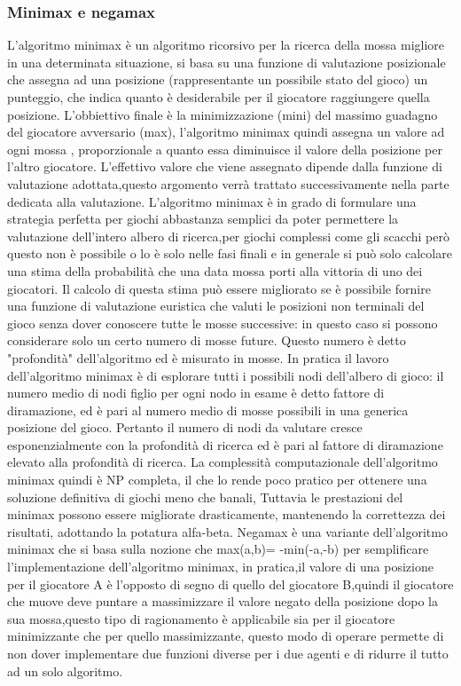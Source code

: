 \subsubsection{Minimax e negamax}
L'algoritmo minimax è un algoritmo ricorsivo per la ricerca della mossa migliore in una determinata situazione,
si basa su una funzione di valutazione posizionale che assegna ad una posizione (rappresentante un possibile stato del gioco)
un punteggio, che indica quanto è desiderabile per il giocatore raggiungere quella posizione.
L'obbiettivo finale è la minimizzazione (mini) del massimo guadagno del giocatore avversario (max),
l'algoritmo minimax quindi  assegna un valore ad ogni mossa , proporzionale a quanto essa diminuisce il
valore della posizione per l'altro giocatore.
L'effettivo valore che viene assegnato dipende dalla funzione di valutazione adottata,questo argomento verrà 
trattato successivamente nella parte dedicata alla valutazione.
L'algoritmo minimax è in grado di formulare una strategia perfetta per giochi abbastanza semplici da poter permettere 
la valutazione dell'intero albero di ricerca,per giochi complessi come gli scacchi però questo non è possibile o lo è 
solo nelle fasi finali e in generale si può solo calcolare una stima della probabilità che una data mossa porti alla vittoria di
uno dei giocatori.
Il calcolo di questa stima può essere migliorato se è possibile fornire una funzione di valutazione euristica che
valuti le posizioni non terminali del gioco senza dover conoscere tutte le mosse successive: in questo caso si possono
considerare solo un certo numero di mosse future. Questo numero è detto "profondità" dell'algoritmo ed è misurato
in mosse.
In pratica il lavoro dell'algoritmo minimax è di esplorare tutti i possibili nodi dell'albero di gioco: il
numero medio di nodi figlio per ogni nodo in esame è detto fattore di diramazione, ed è pari al numero medio
di mosse possibili in una generica posizione del gioco. Pertanto il numero di nodi da valutare cresce
esponenzialmente con la profondità di ricerca ed è pari al fattore di diramazione elevato alla profondità
di ricerca. La complessità computazionale dell'algoritmo minimax quindi è NP completa, il che lo rende poco
pratico per ottenere una soluzione definitiva di giochi meno che banali,
 Tuttavia le prestazioni del minimax possono essere migliorate drasticamente,
mantenendo la correttezza dei risultati, adottando la potatura alfa-beta.
Negamax è una variante dell'algoritmo minimax che si basa sulla nozione che max(a,b)= -min(-a,-b) per semplificare l'implementazione dell'algoritmo minimax,
in pratica,il valore di una posizione per il giocatore A è l'opposto di segno di quello del giocatore B,quindi il giocatore che muove deve puntare a massimizzare il valore negato della posizione
dopo la sua mossa,questo tipo di ragionamento è applicabile sia per il giocatore minimizzante che per quello massimizzante, questo modo di operare permette di non dover implementare due funzioni diverse per i due agenti e di ridurre il tutto ad un solo algoritmo.



